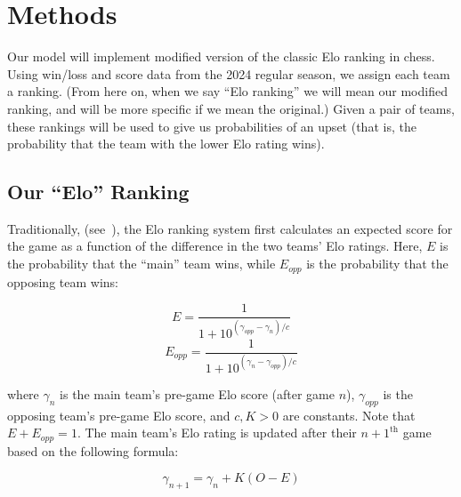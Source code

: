 \documentclass{article}
\begin{document}
\section{Methods}

Our model will implement modified version of the classic Elo ranking in chess. Using win/loss and score data from the 2024 regular season, we assign each team a ranking. (From here on, when we say ``Elo ranking'' we will mean our modified ranking, and will be more specific if we mean the original.) Given a pair of teams, these rankings will be used to give us probabilities of an upset (that is, the probability that the team with the lower Elo rating wins). 


\subsection{Our ``Elo'' Ranking}
Traditionally, (see~\cite{mediumRatingSystem}), the Elo ranking system first calculates an expected score for the game as a function of the difference in the two teams' Elo ratings. Here, $E$ is the probability that the ``main'' team wins, while $E_{opp}$ is the probability that the opposing team wins:

\begin{equation}\label{eq:E}
E = \frac{1}{1+10^{(\gamma_{opp}-\gamma_n)/c}}
\end{equation}
\begin{equation}\label{eq:E_opp}
E_{opp} = \frac{1}{1+10^{(\gamma_n-\gamma_{opp})/c}}
\end{equation}

where $\gamma_n$ is the main team's pre-game Elo score (after game $n$), $\gamma_{opp}$ is the opposing team's pre-game Elo score, and $c, K > 0$ are constants. Note that $E + E_{opp} = 1$. The main team's Elo rating is updated after their $n+1^{\text{th}}$ game based on the following formula:

\begin{equation}
\gamma_{n+1} = \gamma_n + K(O - E)
\end{equation}
\end{document}
